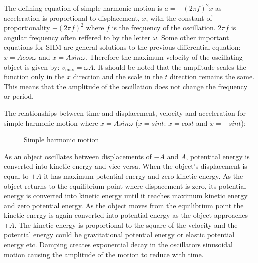 \documentclass[a4,8pt]{article}
\begin{document}
The defining equation of simple harmonic motion is $a=-(2\pi f)^2 x$ as acceleration is proportional to displacement, $x$, with the constant of proportionality $-(2\pi f)^2$ where $f$ is the frequency of the oscillation. $2\pi f$ is angular frequency often reffered to by the letter $\omega$. Some other important equations for SHM are general solutions to the previous differential equation: $x=Acos\omega$ and $x=Asin\omega$. Therefore the maximum velocity of the oscillating object is given by: $v_\text{max}=\omega A$. It should be noted that the amplitude scales the function only in the $x$ direction and the scale in the $t$ direction remains the same. This means that the amplitude of the oscillation does not change the frequency or period.
\vspace{8pt}

The relationships between time and displacement, velocity and acceleration for simple harmonic motion where $x=Asin\omega$ ($x=sint$: $\dot{x}=cost$ and $\ddot{x}=-sint$):
\begin{figure}[H]
\begin{center}
\end{center}
\caption{Simple harmonic motion}
\end{figure}

As an object oscillates between displacements of $-A$ and $A$, potentital energy is converted into kinetic energy and vice versa. When the object's displacement is equal to $\pm A$ it has maximum potential energy and zero kinetic energy. As the object returns to the equilibrium point where dispacement is zero, its potential energy  is converted into kinetic energy until it reaches maximum kinetic energy and zero potential energy. As the object moves from the equilibrium point the kinetic energy is again converted into potential energy as the object approaches $\mp A$. The kinetic energy is proportional to the square of the velocity and the potential energy could be gravitational potential energy or elastic potential energy etc. 
Damping creates exponential decay in the oscillators sinusoidal motion causing the amplitude of the motion to reduce with time.
\end{document}
